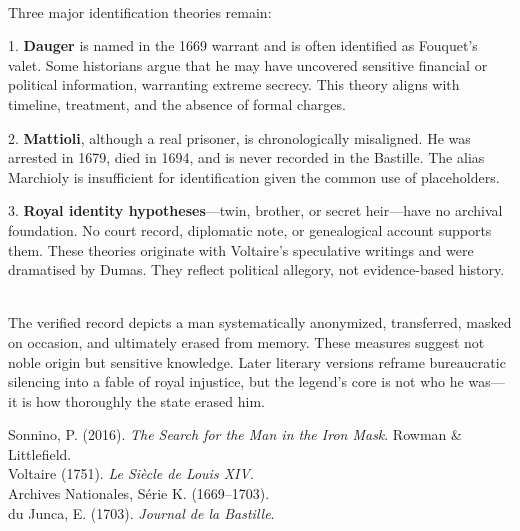\begin{technical}
\\[0.3em]
Three major identification theories remain:

1. \textbf{Dauger} is named in the 1669 warrant and is often identified as Fouquet’s valet. Some historians argue that he may have uncovered sensitive financial or political information, warranting extreme secrecy. This theory aligns with timeline, treatment, and the absence of formal charges.

2. \textbf{Mattioli}, although a real prisoner, is chronologically misaligned. He was arrested in 1679, died in 1694, and is never recorded in the Bastille. The alias \QSOpen{}Marchioly\QSClose{} is insufficient for identification given the common use of placeholders.

3. \textbf{Royal identity hypotheses}—twin, brother, or secret heir—have no archival foundation. No court record, diplomatic note, or genealogical account supports them. These theories originate with Voltaire’s speculative writings and were dramatised by Dumas. They reflect political allegory, not evidence-based history.

\\[0.3em]
The verified record depicts a man systematically anonymized, transferred, masked on occasion, and ultimately erased from memory. These measures suggest not noble origin but sensitive knowledge. Later literary versions reframe bureaucratic silencing into a fable of royal injustice, but the legend’s core is not who he was—it is how thoroughly the state erased him.

\techref
{\footnotesize
Sonnino, P. (2016). \textit{The Search for the Man in the Iron Mask}. Rowman \& Littlefield.\\
Voltaire (1751). \textit{Le Siècle de Louis XIV}.\\
Archives Nationales, Série K. (1669–1703).\\
du Junca, E. (1703). \textit{Journal de la Bastille}.
}
\end{technical}

